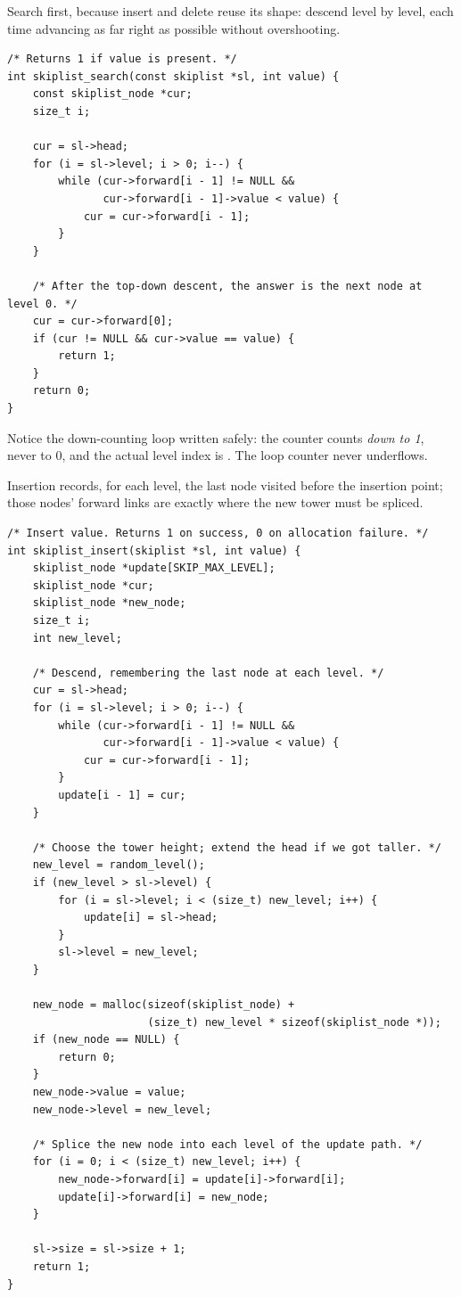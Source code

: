 Search first, because insert and delete reuse its shape: descend level
by level, each time advancing as far right as possible without
overshooting.

\begin{lstlisting}[caption={Search: leap down and to the right.}]
/* Returns 1 if value is present. */
int skiplist_search(const skiplist *sl, int value) {
    const skiplist_node *cur;
    size_t i;

    cur = sl->head;
    for (i = sl->level; i > 0; i--) {
        while (cur->forward[i - 1] != NULL &&
               cur->forward[i - 1]->value < value) {
            cur = cur->forward[i - 1];
        }
    }

    /* After the top-down descent, the answer is the next node at level 0. */
    cur = cur->forward[0];
    if (cur != NULL && cur->value == value) {
        return 1;
    }
    return 0;
}
\end{lstlisting}

Notice the down-counting loop written safely: the  counter
 counts \emph{down to 1}, never to 0, and the actual level
index is . The loop counter never underflows.

Insertion records, for each level, the last node visited before the
insertion point; those nodes' forward links are exactly where the new
tower must be spliced.

\begin{lstlisting}[caption={Insert: record the update path, then splice the tower.}]
/* Insert value. Returns 1 on success, 0 on allocation failure. */
int skiplist_insert(skiplist *sl, int value) {
    skiplist_node *update[SKIP_MAX_LEVEL];
    skiplist_node *cur;
    skiplist_node *new_node;
    size_t i;
    int new_level;

    /* Descend, remembering the last node at each level. */
    cur = sl->head;
    for (i = sl->level; i > 0; i--) {
        while (cur->forward[i - 1] != NULL &&
               cur->forward[i - 1]->value < value) {
            cur = cur->forward[i - 1];
        }
        update[i - 1] = cur;
    }

    /* Choose the tower height; extend the head if we got taller. */
    new_level = random_level();
    if (new_level > sl->level) {
        for (i = sl->level; i < (size_t) new_level; i++) {
            update[i] = sl->head;
        }
        sl->level = new_level;
    }

    new_node = malloc(sizeof(skiplist_node) +
                      (size_t) new_level * sizeof(skiplist_node *));
    if (new_node == NULL) {
        return 0;
    }
    new_node->value = value;
    new_node->level = new_level;

    /* Splice the new node into each level of the update path. */
    for (i = 0; i < (size_t) new_level; i++) {
        new_node->forward[i] = update[i]->forward[i];
        update[i]->forward[i] = new_node;
    }

    sl->size = sl->size + 1;
    return 1;
}
\end{lstlisting}

